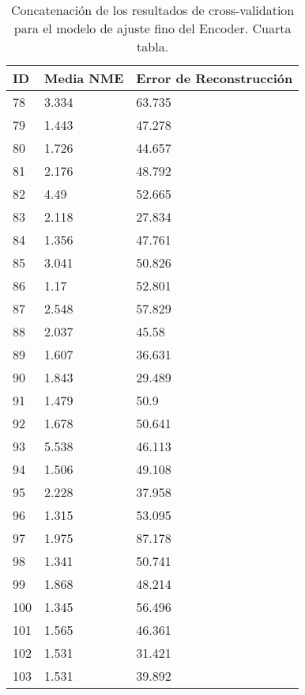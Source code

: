\begin{table}[!ht]
    \centering
    \caption{Concatenación de los resultados de cross-validation para el modelo de ajuste fino del Encoder. Cuarta tabla.}
    \begin{tabular}{|l|l|l|}
    \hline
    \cellcolor{gray!25}\textbf{ID} & \cellcolor{gray!25}\textbf{Media NME} & \cellcolor{gray!25}\textbf{Error de Reconstrucción} \\ \hline
        78 & 3.334 & 63.735 \\ \hline
        79 & 1.443 & 47.278 \\ \hline
        80 & 1.726 & 44.657 \\ \hline
        81 & 2.176 & 48.792 \\ \hline
        82 & 4.49 & 52.665 \\ \hline
        83 & 2.118 & 27.834 \\ \hline
        84 & 1.356 & 47.761 \\ \hline
        85 & 3.041 & 50.826 \\ \hline
        86 & 1.17 & 52.801 \\ \hline
        87 & 2.548 & 57.829 \\ \hline
        88 & 2.037 & 45.58 \\ \hline
        89 & 1.607 & 36.631 \\ \hline
        90 & 1.843 & 29.489 \\ \hline
        91 & 1.479 & 50.9 \\ \hline
        92 & 1.678 & 50.641 \\ \hline
        93 & 5.538 & 46.113 \\ \hline
        94 & 1.506 & 49.108 \\ \hline
        95 & 2.228 & 37.958 \\ \hline
        96 & 1.315 & 53.095 \\ \hline
        97 & 1.975 & 87.178 \\ \hline
        98 & 1.341 & 50.741 \\ \hline
        99 & 1.868 & 48.214 \\ \hline
        100 & 1.345 & 56.496 \\ \hline
        101 & 1.565 & 46.361 \\ \hline
        102 & 1.531 & 31.421 \\ \hline
        103 & 1.531 & 39.892 \\ \hline
    \end{tabular}
\end{table}

